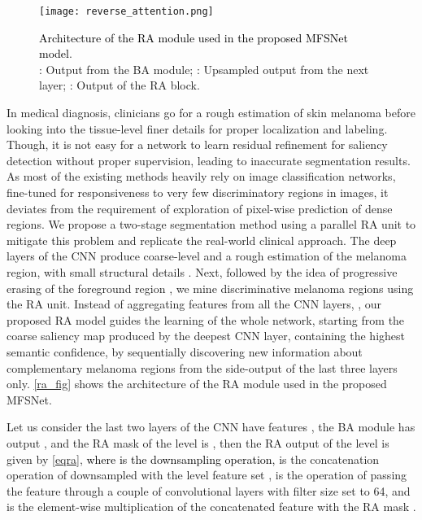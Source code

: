 \documentclass[review]{elsarticle}
\begin{document}
\begin{figure*}
    \centering
\texttt{[image: reverse\_attention.png]}
\caption{\textcolor{black}{Architecture of the RA module used in the proposed MFSNet model}.\\: Output from the BA module; : Upsampled output from the next layer; : Output of the RA block.}
    \label{ra_fig}
\end{figure*}

In medical diagnosis, clinicians go for a rough estimation of skin melanoma before looking into the tissue-level finer details for proper localization and labeling. Though, it is not easy for a network to learn residual refinement for saliency detection without proper supervision, leading to inaccurate segmentation results. As most of the existing methods heavily rely on image classification networks, fine-tuned for responsiveness to very few discriminatory regions in images, it deviates from the requirement of exploration of pixel-wise prediction of dense regions. We propose a two-stage segmentation method using a parallel RA unit to mitigate this problem and replicate the real-world clinical approach. The deep layers of the CNN produce coarse-level and a rough estimation of the melanoma region, with small structural details \cite{burdick2018rethinking}. Next, followed by the idea of progressive erasing of the foreground region \cite{wei2017object}, we mine discriminative melanoma regions using the RA unit. Instead of aggregating features from all the CNN layers, \cite{chen2018reverse}, our proposed RA model guides the learning of the whole network, starting from the coarse saliency map produced by the deepest CNN layer, containing the highest semantic confidence, by sequentially discovering new information about complementary melanoma regions from the side-output of the last three layers only. \autoref{ra_fig} shows the architecture of the RA module used in the proposed MFSNet.

Let us consider the last two layers of the CNN have features  , the BA module has output , and the RA mask of the  level is , then the RA output  of the  level is given by \autoref{eqra},\textcolor{black}{ where  is the downsampling operation,}  is the concatenation operation of downsampled  with the  level feature set ,  is the operation of passing the feature through a couple of convolutional layers with filter size set to 64, and  is the element-wise multiplication of the concatenated feature with the RA mask .
\end{document}
